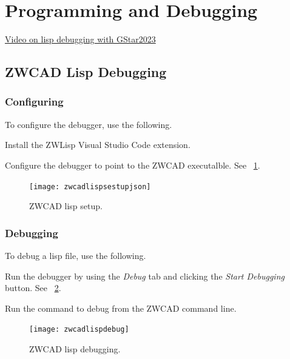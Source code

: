 \documentclass{lebook}
\begin{document}
\section{Programming and Debugging}
\begin{bulletedlist}
	\item \href{https://www.youtube.com/watch?v=Rrgx3TcXNzM}{Video on lisp debugging with GStar2023}
\end{bulletedlist}

\subsection{ZWCAD Lisp Debugging}
\subsubsection{Configuring}
To configure the debugger, use the following.
\begin{numberedlist}
	\item Install the ZWLisp Visual Studio Code extension.
	\item Configure the debugger to point to the ZWCAD executalble.  See \figurename~\ref{fig:zwcadlispsestupjson}.
\end{numberedlist}

\begin{figure}
	\centering
	\texttt{[image: zwcadlispsestupjson]}
	\caption{ZWCAD lisp setup.}
	\label{fig:zwcadlispsestupjson}
\end{figure}

\subsubsection{Debugging}
To debug a lisp file, use the following.
\begin{numberedlist}
	\item Run the debugger by using the \textit{Debug} tab and clicking the \textit{Start Debugging} button.  See \figurename~\ref{fig:zwcadlispdebug}.
	\item Run the command to debug from the ZWCAD command line.
\end{numberedlist}

\begin{figure}
	\centering
	\texttt{[image: zwcadlispdebug]}
	\caption{ZWCAD lisp debugging.}
	\label{fig:zwcadlispdebug}
\end{figure}
\end{document}
